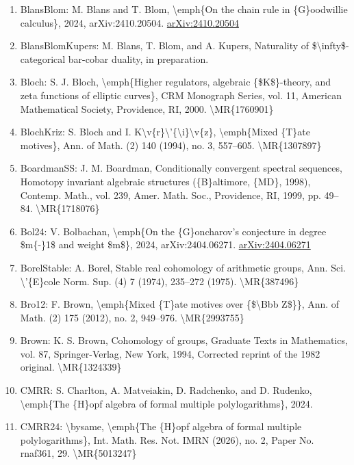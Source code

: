 \documentclass[11pt]{article}
\begin{document}
\begin{enumerate}[leftmargin=*]
  \item BlansBlom: M. Blans and T. Blom, \textbackslash{}emph\{On the chain rule in \{G\}oodwillie calculus\}, 2024, arXiv:2410.20504. \href{https://arxiv.org/abs/2410.20504}{arXiv:2410.20504}
  \item BlansBlomKupers: M. Blans, T. Blom, and A. Kupers, Naturality of \$\textbackslash{}infty\$-categorical bar-cobar duality, in preparation.
  \item Bloch: S. J. Bloch, \textbackslash{}emph\{Higher regulators, algebraic \{\$K\$\}-theory, and zeta functions of elliptic curves\}, CRM Monograph Series, vol. 11, American Mathematical Society, Providence, RI, 2000. \textbackslash{}MR\{1760901\}
  \item BlochKriz: S. Bloch and I. K\textbackslash{}v\{r\}\textbackslash{}'\{\textbackslash{}i\}\textbackslash{}v\{z\}, \textbackslash{}emph\{Mixed \{T\}ate motives\}, Ann. of Math. (2) 140 (1994), no. 3, 557--605. \textbackslash{}MR\{1307897\}
  \item BoardmanSS: J. M. Boardman, Conditionally convergent spectral sequences, Homotopy invariant algebraic structures (\{B\}altimore, \{MD\}, 1998), Contemp. Math., vol. 239, Amer. Math. Soc., Providence, RI, 1999, pp. 49--84. \textbackslash{}MR\{1718076\}
  \item Bol24: V. Bolbachan, \textbackslash{}emph\{On the \{G\}oncharov's conjecture in degree \$m\{-\}1\$ and weight \$m\$\}, 2024, arXiv:2404.06271. \href{https://arxiv.org/abs/2404.06271}{arXiv:2404.06271}
  \item BorelStable: A. Borel, Stable real cohomology of arithmetic groups, Ann. Sci. \textbackslash{}'\{E\}cole Norm. Sup. (4) 7 (1974), 235--272 (1975). \textbackslash{}MR\{387496\}
  \item Bro12: F. Brown, \textbackslash{}emph\{Mixed \{T\}ate motives over \{\$\textbackslash{}Bbb Z\$\}\}, Ann. of Math. (2) 175 (2012), no. 2, 949--976. \textbackslash{}MR\{2993755\}
  \item Brown: K. S. Brown, Cohomology of groups, Graduate Texts in Mathematics, vol. 87, Springer-Verlag, New York, 1994, Corrected reprint of the 1982 original. \textbackslash{}MR\{1324339\}
  \item CMRR: S. Charlton, A. Matveiakin, D. Radchenko, and D. Rudenko, \textbackslash{}emph\{The \{H\}opf algebra of formal multiple polylogarithms\}, 2024.
  \item CMRR24: \textbackslash{}bysame, \textbackslash{}emph\{The \{H\}opf algebra of formal multiple polylogarithms\}, Int. Math. Res. Not. IMRN (2026), no. 2, Paper No. rnaf361, 29. \textbackslash{}MR\{5013247\}

\end{enumerate}
\end{document}
